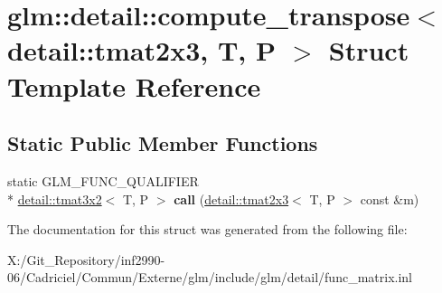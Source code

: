 \hypertarget{structglm_1_1detail_1_1compute__transpose_3_01detail_1_1tmat2x3_00_01_t_00_01_p_01_4}{\section{glm\-:\-:detail\-:\-:compute\-\_\-transpose$<$ detail\-:\-:tmat2x3, T, P $>$ Struct Template Reference}
\label{structglm_1_1detail_1_1compute__transpose_3_01detail_1_1tmat2x3_00_01_t_00_01_p_01_4}
}
\subsection*{Static Public Member Functions}
\begin{DoxyCompactItemize}
\item 
\hypertarget{structglm_1_1detail_1_1compute__transpose_3_01detail_1_1tmat2x3_00_01_t_00_01_p_01_4_a4eb080988185ee66f639a17c9a6f548d}{static G\-L\-M\-\_\-\-F\-U\-N\-C\-\_\-\-Q\-U\-A\-L\-I\-F\-I\-E\-R \\*
\hyperlink{structglm_1_1detail_1_1tmat3x2}{detail\-::tmat3x2}$<$ T, P $>$ {\bfseries call} (\hyperlink{structglm_1_1detail_1_1tmat2x3}{detail\-::tmat2x3}$<$ T, P $>$ const \&m)}\label{structglm_1_1detail_1_1compute__transpose_3_01detail_1_1tmat2x3_00_01_t_00_01_p_01_4_a4eb080988185ee66f639a17c9a6f548d}

\end{DoxyCompactItemize}


The documentation for this struct was generated from the following file\-:\begin{DoxyCompactItemize}
\item 
X\-:/\-Git\-\_\-\-Repository/inf2990-\/06/\-Cadriciel/\-Commun/\-Externe/glm/include/glm/detail/func\-\_\-matrix.\-inl\end{DoxyCompactItemize}
